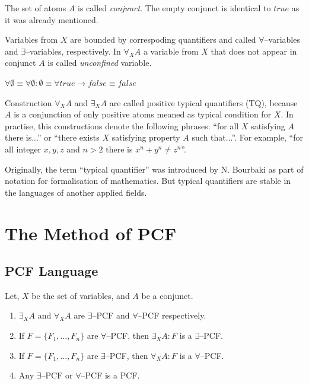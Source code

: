 \documentclass[runningheads,a4paper]{llncs}
\begin{document}
The set of atoms $A$ is called {\em conjunct}. The empty conjunct is identical to $true$ as it was already mentioned.

Variables from $X$ are bounded by correspoding quantifiers and called $\forall$--variables and $\exists$--variables, respectively. In $\forall_XA$ a variable from $X$ that does not appear in conjunct $A$ is called {\em unconfined} variable.

$\forall \emptyset \equiv \forall \emptyset\colon\emptyset \equiv \forall true \rightarrow false \equiv false$

Construction $\forall_XA$ and $\exists_XA$ are called positive typical quantifiers (TQ), because $A$ is a conjunction of only positive atoms meaned as typical condition for $X$. In practise, this constructions denote the following phrases: ``for all $X$ satisfying $A$ there is...'' or ``there exists $X$ satisfying property $A$ such that...''. For example, ``for all integer $x,y,z$ and $n>2$ there is $x^n + y^n \ne z^n$''.

Originally, the term ``typical quantifier'' was introduced by N. Bourbaki \cite{Bourbaki} as part of notation for formalisation of mathematics. But typical quantifiers are stable in the languages of another applied fields.

\section{The Method of PCF}

\subsection{PCF Language}

\begin{definition}
\label{def:pcf}
Let, $X$ be the set of variables, and $A$ be a conjunct.
\begin{enumerate}

\item $\exists_XA$ and $\forall_XA$ are $\exists$--PCF and $\forall$--PCF respectively.

\item If $F = \{F_1,\ldots,F_n\}$ are $\forall$--PCF, then $\exists_XA\colon F$ is a $\exists$--PCF.

\item If $F = \{F_1,\ldots,F_n\}$ are $\exists$--PCF, then $\forall_XA\colon F$ is a $\forall$--PCF.

\item Any $\exists$--PCF or $\forall$--PCF is a PCF.
\end{enumerate}
\end{definition}
\end{document}
